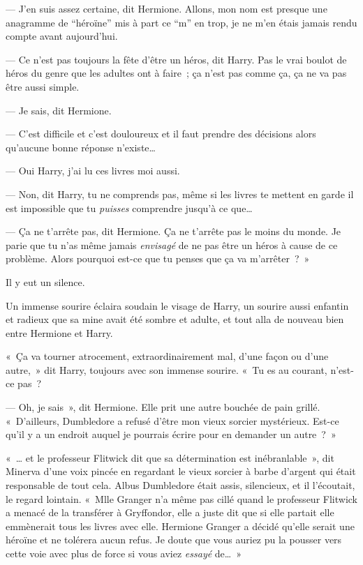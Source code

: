 --- J'en suis assez certaine, dit Hermione. Allons, mon nom est presque une anagramme de “héroïne” mis à part ce “m” en trop, je ne m'en étais jamais rendu compte avant aujourd'hui.

--- Ce n'est pas toujours la fête d'être un héros, dit Harry. Pas le vrai boulot de héros du genre que les adultes ont à faire~; ça n'est pas comme ça, ça ne va pas être aussi simple.

--- Je sais, dit Hermione.

--- C'est difficile et c'est douloureux et il faut prendre des décisions alors qu'aucune bonne réponse n'existe…

--- Oui Harry, j'ai lu ces livres moi aussi.

--- Non, dit Harry, tu ne comprends pas, même si les livres te mettent en garde il est impossible que tu \emph{puisses} comprendre jusqu'à ce que…

--- Ça ne t'arrête pas, dit Hermione. Ça ne t'arrête pas le moins du monde. Je parie que tu n'as même jamais \emph{envisagé} de ne pas être un héros à cause de ce problème. Alors pourquoi est-ce que tu penses que ça va m'arrêter~?~»

Il y eut un silence.

Un immense sourire éclaira soudain le visage de Harry, un sourire aussi enfantin et radieux que sa mine avait été sombre et adulte, et tout alla de nouveau bien entre Hermione et Harry.

«~Ça va tourner atrocement, extraordinairement mal, d'une façon ou d'une autre,~» dit Harry, toujours avec son immense sourire. «~Tu es au courant, n'est-ce pas~?

--- Oh, je sais~», dit Hermione. Elle prit une autre bouchée de pain grillé. «~D'ailleurs, Dumbledore a refusé d'être mon vieux sorcier mystérieux. Est-ce qu'il y a un endroit auquel je pourrais écrire pour en demander un autre~?~»


«~… et le professeur Flitwick dit que sa détermination est inébranlable~», dit Minerva d'une voix pincée en regardant le vieux sorcier à barbe d'argent qui était responsable de tout cela. Albus Dumbledore était assis, silencieux, et il l'écoutait, le regard lointain. «~Mlle Granger n'a même pas cillé quand le professeur Flitwick a menacé de la transférer à Gryffondor, elle a juste dit que si elle partait elle emmènerait tous les livres avec elle. Hermione Granger a décidé qu'elle serait une héroïne et ne tolérera aucun refus. Je doute que vous auriez pu la pousser vers cette voie avec plus de force si vous aviez \emph{essayé} de…~»

